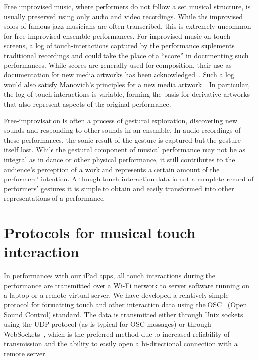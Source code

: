 \documentclass[graybox]{svmult}
\begin{document}
Free improvised music, where performers do not follow a set musical
structure, is usually preserved using only audio and video recordings.
While the improvised solos of famous jazz musicians are often
transcribed, this is extremely uncommon for free-improvised ensemble
performances. For improvised music on touch-screens, a log of
touch-interactions captured by the performance suplements traditional
recordings and could take the place of a ``score'' in documenting such
performances. While scores are generally used for composition, their
use as documentation for new media artworks has been
acknowledged~\cite{MacDonald:2009ve}. Such a log would also satisfy
Manovich's principles for a new media artwork~\cite{Manovich:2002ly}.
In particular, the log of touch-interactions is variable, forming the
basis for derivative artworks that also represent aspects of the
original performance.

Free-improvisation is often a process of gestural exploration,
discovering new sounds and responding to other sounds in an ensemble.
In audio recordings of these performances, the sonic result of the
gesture is captured but the gesture itself lost. While the gestural
component of musical performance may not be as integral as in dance or
other physical performance, it still contributes to the audience's
perception of a work and represents a certain amount of the
performers' intention. Although touch-interaction data is not a
complete record of performers' gestures it is simple to obtain and
easily transformed into other representations of a performance.



\section{Protocols for musical touch interaction}
\label{sec:protocols}

In performances with our iPad apps, all touch interactions during the
performance are transmitted over a Wi-Fi network to server software
running on a laptop or a remote virtual server. We have developed a
relatively simple protocol for formatting touch and other interaction
data using the OSC~\cite{osc-nime2009} (Open Sound Control) standard.
The data is transmitted either through Unix sockets using the UDP
protocol (as is typical for OSC messages) or through
WebSockets~\cite{Fette:2011eu}, which is the preferred method due to
increased reliability of transmission and the ability to easily open a
bi-directional connection with a remote server. 
\end{document}
